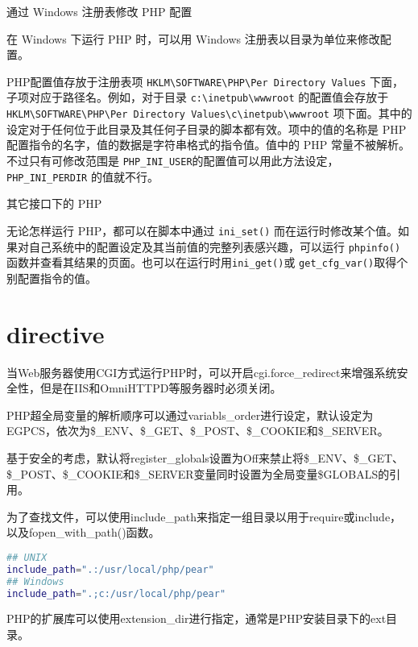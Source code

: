\begin{compactitem}
\item 通过 Windows 注册表修改 PHP 配置 

在 Windows 下运行 PHP 时，可以用 Windows 注册表以目录为单位来修改配置。

PHP配置值存放于注册表项 \texttt{HKLM{\textbackslash}SOFTWARE{\textbackslash}PHP{\textbackslash}Per Directory Values} 下面，子项对应于路径名。例如，对于目录 \texttt{c:{\textbackslash}inetpub{\textbackslash}wwwroot} 的配置值会存放于 \texttt{HKLM{\textbackslash}SOFTWARE{\textbackslash}PHP{\textbackslash}Per Directory Values{\textbackslash}c{\textbackslash}inetpub{\textbackslash}wwwroot} 项下面。其中的设定对于任何位于此目录及其任何子目录的脚本都有效。项中的值的名称是 PHP 配置指令的名字，值的数据是字符串格式的指令值。值中的 PHP 常量不被解析。不过只有可修改范围是 \texttt{PHP\_INI\_USER}的配置值可以用此方法设定，\texttt{PHP\_INI\_PERDIR} 的值就不行。

\item 其它接口下的 PHP

无论怎样运行 PHP，都可以在脚本中通过 \texttt{ini\_set()} 而在运行时修改某个值。如果对自己系统中的配置设定及其当前值的完整列表感兴趣，可以运行 \texttt{phpinfo()} 函数并查看其结果的页面。也可以在运行时用\texttt{ini\_get()}或 \texttt{get\_cfg\_var()}取得个别配置指令的值。

\end{compactitem}


\section{directive}


当Web服务器使用CGI方式运行PHP时，可以开启cgi.force\_redirect来增强系统安全性，但是在IIS和OmniHTTPD等服务器时必须关闭。

PHP超全局变量的解析顺序可以通过variabls\_order进行设定，默认设定为EGPCS，依次为\$\_ENV、\$\_GET、\$\_POST、\$\_COOKIE和\$\_SERVER。

基于安全的考虑，默认将register\_globals设置为Off来禁止将\$\_ENV、\$\_GET、\$\_POST、\$\_COOKIE和\$\_SERVER变量同时设置为全局变量\$GLOBALS的引用。

为了查找文件，可以使用include\_path来指定一组目录以用于require或include，以及fopen\_with\_path()函数。

\begin{lstlisting}[language=bash]
## UNIX
include_path=".:/usr/local/php/pear"
## Windows
include_path=".;c:/usr/local/php/pear"
\end{lstlisting}

PHP的扩展库可以使用extension\_dir进行指定，通常是PHP安装目录下的ext目录。


